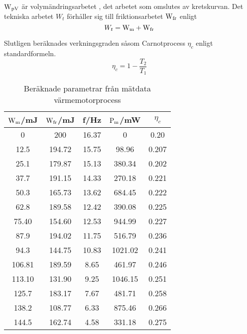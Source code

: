 \documentclass[11pt,a4paper]{article}
\begin{document}
 $\rm{W_{pV}}$ är volymändringsarbetet , det arbetet som omslutes av kretskurvan.
Det tekniska arbetet $W_{t}$ förhåller sig till friktionsarbetet $\rm{W_{fr}}$ enligt
\begin{equation}
W_{t} = \rm{W_m} + \rm{W_{fr}}
\end{equation}

Slutligen beräknades verkningsgraden såsom Carnotprocess $\eta_c$ 
enligt standardformeln.
\begin{equation}
\eta_c = 1-\frac{T_2}{T_1}
\end{equation}

\begin{table}[h!]
\centering
\begin{tabular}{||c c c c c ||} 
 \hline
$\rm{W_m}$/mJ & $\rm{W_{fr}}$/mJ & f/Hz & $\rm{P_m}$/mW & $\eta_c$\\ [0.5ex] 
\hline\hline
	0	&200&	16.37&	0&	0.20\\
12.5&	194.72&	15.75&	98.96&	0.207\\
25.1&	179.87&	15.13&	380.34&	0.202\\
37.7&	191.15&	14.33&	270.18&	0.221\\
50.3&	165.73&	13.62&	684.45&	0.222\\
62.8&	189.58&	12.42&	390.08&	0.225\\
75.40&	154.60&	12.53&	944.99&	0.227\\
87.9&	194.02&	11.75	&516.79&	0.236\\
94.3&	144.75&	10.83&	1021.02&	0.241\\
106.81&	189.59&	8.65&	461.97&	0.246\\
113.10&	131.90&	9.25&	1046.15&	0.251\\
125.7&	183.17&	7.67&	481.71&	0.258\\
138.2&	108.77&	6.33&	875.46&	0.266\\
144.5&	162.74&	4.58&	331.18&	0.275\\[1ex] 
 \hline
\end{tabular}
\caption{Beräknade parametrar från mätdata värmemotorprocess}
\label{table:2}
\end{table}
\end{document}
